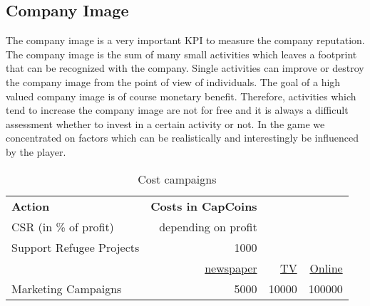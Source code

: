 \subsection{Company Image} \label{company_image}


The company image is a very important KPI to measure the company reputation. The company image is the sum of many small activities which leaves a footprint that can be recognized with the company. Single activities can improve or destroy the company image from the point of view of individuals. The goal of a high valued company image is of course monetary benefit. Therefore, activities which tend to increase the company image are not for free and it is always a difficult assessment whether to invest in a certain activity or not. In the game we concentrated on factors which can be realistically and interestingly be influenced by the player.

\begin{table}[]
\begin{tabular}{|l|r|r|r|}
\hline
\multicolumn{1}{|l|}{\textbf{Action}} & \multicolumn{1}{l}{\textbf{Costs in CapCoins}} & \multicolumn{1}{l}{} & \multicolumn{1}{l|}{} \\
CSR (in \% of profit)     & depending on profit &                   & \\
Support Refugee Projects  & 1000        &                   & \\
  & \underline{newspaper} & \underline{TV}      &  \underline{Online} \\
Marketing Campaigns       & 5000                & 10000             & 100000 \\
\hline
\end{tabular}
\caption{Cost campaigns}
\label{cost_campaigns}
\end{table}

